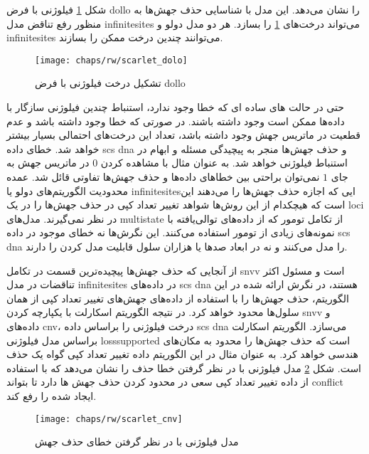 شکل \ref{fig:ch_rw:scarlet_dolo} فیلوژنی با فرض \gls{dollo} را نشان می‌دهد. این مدل با شناسایی حذف جهش‌ها به منظور رفع تناقض مدل  \gls{infinitesites} می‌تواند درخت‌های \ref{fig:ch_rw:scarlet_dolo} را بسازد. هر دو مدل دولو و \gls{infinitesites} می‌توانند چندین درخت ممکن را بسازند. 
\begin{figure}[!ht]
	\centerline{\texttt{[image: chaps/rw/scarlet\_dolo]}}
	\caption{تشکیل درخت فیلوژنی با فرض \gls{dollo}}
	\label{fig:ch_rw:scarlet_dolo}
\end{figure}
حتی در حالت های ساده ای که خطا وجود ندارد، استنباط چندین فیلوژنی سازگار با داده‌ها ممکن است وجود داشته باشند. در صورتی که خطا وجود داشته باشد و عدم قطعیت در ماتریس جهش وجود داشته باشد، تعداد این درخت‌های احتمالی بسیار بیشتر خواهد شد. خطای داده \gls{scs} \gls{dna} و حذف جهش‌ها منجر به پیچیدگی مسئله و ابهام در استنباط فیلوژنی خواهد شد. به عنوان مثال با مشاهده کردن $0$ در ماتریس جهش به جای $1$ نمی‌توان براحتی بین خطاهای داده‌ها و حذف جهش‌ها تفاوتی قائل شد. عمده محدودیت الگوریتم‌های دولو یا \gls{infinitesites}ایی که اجازه حذف جهش‌ها را می‌دهند این است که هیچکدام از این روش‌ها شواهد تغییر تعداد کپی در حذف جهش‌ها را در یک  \gls{loci} در نظر نمی‌گیرند. مدل‌های \gls{multistate} از تکامل تومور که از داده‌های توالی‌یافته با نمونه‌های زیادی از تومور استفاده می‌کنند. این نگرش‌ها نه خطای موجود در داده \gls{scs} \gls{dna} را مدل می‌کنند و نه در ابعاد صدها یا هزاران سلول قابلیت مدل کردن را دارند. 

از آنجایی که حذف جهش‌ها پیچیده‌ترین قسمت در تکامل \gls{snvv} است و مسئول اکثر تناقضات در مدل \gls{infinitesites} در داده‌های \gls{scs} \gls{dna} هستند، در نگرش ارائه شده در این الگوریتم، حذف جهش‌ها را با  استفاده از داده‌های جهش‌های تغییر تعداد کپی از همان سلول‌ها محدود خواهد کرد. در نتیجه الگوریتم اسکارلت با یکپارچه کردن \gls{snvv} و داده‌های \gls{cnv}، درخت فیلوژنی را براساس داده \gls{scs} \gls{dna}  می‌سازد. الگوریتم اسکارلت براساس مدل فیلوژنی \gls{losssupported} است که حذف جهش‌ها را محدود به مکان‌های هندسی خواهد کرد. به عنوان مثال در این الگوریتم  داده تغییر تعداد کپی گواه یک حذف است. شکل \ref{fig:ch_rw:scarlet_cnv} مدل فیلوژنی با در نظر گرفتن خطا حذف را نشان می‌دهد که با استفاده از داده تغییر تعداد کپی  سعی در محدود کردن حذف جهش ها دارد تا بتواند \gls{conflict} ایجاد شده را رفع کند. 

\begin{figure}[!ht]
	\centerline{\texttt{[image: chaps/rw/scarlet\_cnv]}}
	\caption{مدل فیلوژنی با در نظر گرفتن خطای حذف جهش}
	\label{fig:ch_rw:scarlet_cnv}
\end{figure}

